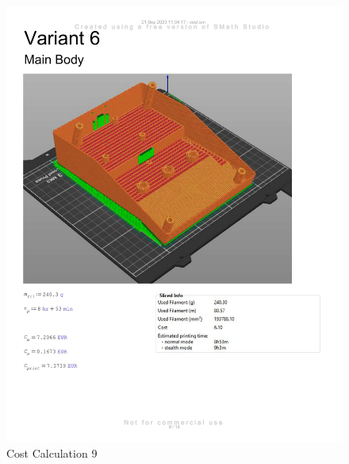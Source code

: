 \begin{figure}[H]
    \centering
    \includegraphics[width=\linewidth]{texs/appendix/data/cost1-09.jpg}
    \caption{Cost Calculation 9}
    \label{fig:cost-calculation-9}
\end{figure}

